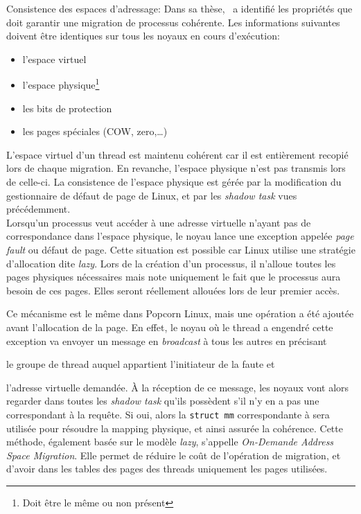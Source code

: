       \begin{paragraph}{Consistence des espaces d'adressage:}
        Dans sa thèse,~\citeauthor{katz2013popcorn} a identifié les propriétés
        que doit garantir une migration de processus cohérente. Les informations
        suivantes doivent être identiques sur tous les noyaux en cours
        d'exécution:
        \begin{itemize}
          \item l'espace virtuel
          \item l'espace physique\footnote{Doit être le même ou non présent}
          \item les bits de protection
          \item les pages spéciales (COW, zero,\ldots)\\
        \end{itemize}

        L'espace virtuel d'un thread est maintenu cohérent car il est
        entièrement recopié lors de chaque migration. En revanche, l'espace
        physique n'est pas transmis lors de celle-ci. La consistence de l'espace
        physique est gérée par la modification du gestionnaire de défaut de page
        de Linux, et par les \textit{shadow task} vues précédemment.\\

        Lorsqu'un processus veut accéder à une adresse virtuelle n'ayant pas de
        correspondance dans l'espace physique, le noyau lance une exception
        appelée \textit{page fault} ou défaut de page. Cette situation est
        possible car Linux utilise une stratégie d'allocation dite
        \textit{lazy}. Lors de la création d'un processus, il n'alloue toutes
        les pages physiques nécessaires mais note uniquement le fait que le
        processus aura besoin de ces pages. Elles seront réellement allouées
        lors de leur premier accès.

        Ce mécanisme est le même dans Popcorn Linux, mais une opération a été
        ajoutée avant l'allocation de la page. En effet, le noyau où le thread a
        engendré cette exception va envoyer un message en \textit{broadcast} à
        tous les autres en précisant\benumline \item le groupe de thread auquel
        appartient l'initiateur de la faute et \item l'adresse virtuelle
        demandée\eenumline. À la réception de ce message, les noyaux vont alors
        regarder dans toutes les \textit{shadow task} qu'ils possèdent s'il n'y
        en a pas une correspondant à la requête. Si oui, alors la \texttt{struct
          mm} correspondante à sera utilisée pour résoudre la mapping physique,
        et ainsi assurée la cohérence. Cette méthode, également basée sur le
        modèle \textit{lazy}, s'appelle \textit{On-Demande Address Space
          Migration}. Elle permet de réduire le coût de l'opération de
        migration, et d'avoir dans les tables des pages des threads uniquement
        les pages utilisées.


\end{paragraph}
